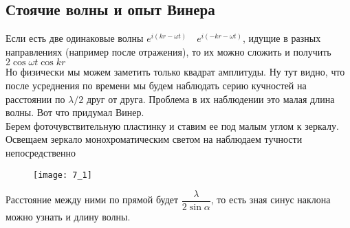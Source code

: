 	\subsection*{Стоячие волны и опыт Винера}
	Если есть две одинаковые волны $e^{i (kr - \omega t)} \quad e^{i (-kr - \omega t)}$, идущие в разных направлениях (например после отражения), то их можно сложить и получить $2\cos \omega t \cos k r$\\
	Но физически мы можем заметить только квадрат амплитуды. Ну тут видно, что после усреднения по времени мы будем наблюдать серию кучностей на расстоянии по $\lambda/2$ друг от друга. Проблема в их наблюдении это малая длина волны. Вот что придумал Винер.\\
	Берем фоточувствительную пластинку и ставим ее под малым углом к зеркалу. Освещаем зеркало монохроматическим светом на наблюдаем тучности непосредственно
	\begin{figure}[H]
		\centering
		\texttt{[image: 7\_1]}
	\end{figure}
	Расстояние между ними по прямой будет $\dfrac{\lambda}{2 \sin \alpha}$, то есть зная синус наклона можно узнать и длину волны.  